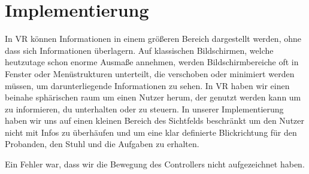 \section{Implementierung}

In VR können Informationen in einem größeren Bereich dargestellt werden, ohne dass sich Informationen überlagern.
Auf klassischen Bildschirmen, welche heutzutage schon enorme Ausmaße annehmen, werden Bildschirmbereiche oft in Fenster oder Menüstrukturen unterteilt, die verschoben oder minimiert werden müssen, um darunterliegende Informationen zu sehen. 
In VR haben wir einen beinahe sphärischen raum um einen Nutzer herum, der genutzt werden kann um zu informieren, du unterhalten oder zu steuern. 
In unserer Implementierung haben wir uns auf einen kleinen Bereich des Sichtfelds beschränkt um den Nutzer nicht mit Infos zu überhäufen und um eine klar definierte Blickrichtung für den Probanden, den Stuhl und die Aufgaben zu erhalten.

Ein Fehler war, dass wir die Bewegung des Controllers nicht aufgezeichnet haben.
